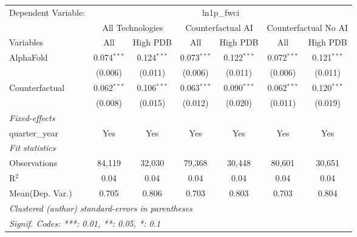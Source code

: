 \begingroup
\centering
\begin{tabular}{lcccccc}
   \tabularnewline \midrule \midrule
   Dependent Variable: & \multicolumn{6}{c}{ln1p\_fwci}\\
 & \multicolumn{2}{c}{All Technologies} & \multicolumn{2}{c}{Counterfactual AI} & \multicolumn{2}{c}{Counterfactual No AI} \\
\cmidrule(lr){1-1}\cmidrule(lr){2-3} \cmidrule(lr){4-5} \cmidrule(lr){6-7}
Variables & \multicolumn{1}{c}{All} & \multicolumn{1}{c}{High PDB} & \multicolumn{1}{c}{All} & \multicolumn{1}{c}{High PDB} & \multicolumn{1}{c}{All} & \multicolumn{1}{c}{High PDB} \\
\cmidrule(lr){1-1}\cmidrule(lr){2-2} \cmidrule(lr){3-3} \cmidrule(lr){4-4} \cmidrule(lr){5-5} \cmidrule(lr){6-6} \cmidrule(lr){7-7}
   AlphaFold      & 0.074$^{***}$ & 0.124$^{***}$ & 0.073$^{***}$ & 0.122$^{***}$ & 0.072$^{***}$ & 0.121$^{***}$\\   
                  & (0.006)       & (0.011)       & (0.006)       & (0.011)       & (0.006)       & (0.011)\\   
   Counterfactual & 0.062$^{***}$ & 0.106$^{***}$ & 0.063$^{***}$ & 0.090$^{***}$ & 0.062$^{***}$ & 0.120$^{***}$\\   
                  & (0.008)       & (0.015)       & (0.012)       & (0.020)       & (0.011)       & (0.019)\\   
   \midrule
   \emph{Fixed-effects}\\
   quarter\_year  & Yes           & Yes           & Yes           & Yes           & Yes           & Yes\\  
   \midrule
   \emph{Fit statistics}\\
   Observations   & 84,119        & 32,030        & 79,368        & 30,448        & 80,601        & 30,651\\  
   R$^2$          & 0.04          & 0.04          & 0.04          & 0.04          & 0.04          & 0.04\\  
Mean(Dep. Var.) & 0.705 & 0.806 & 0.703 & 0.803 & 0.703 & 0.804 \\
   \midrule \midrule
   \multicolumn{7}{l}{\emph{Clustered (author) standard-errors in parentheses}}\\
   \multicolumn{7}{l}{\emph{Signif. Codes: ***: 0.01, **: 0.05, *: 0.1}}\\
\end{tabular}
\par\endgroup
